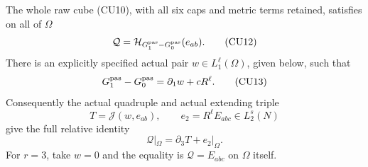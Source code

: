 \begin{theorem}
The whole raw cube (CU10), with all six caps and metric terms retained,
satisfies on all of $\Omega$
\[
       \mathcal Q=\mathcal H_{G_1^{\rm pas}-G_0^{\rm pas}}(e_{ab}).
 \tag{CU12}
\]
There is an explicitly specified actual pair
$w\in L_1^\ell(\Omega)$, given below, such that
\[
       G_1^{\rm pas}-G_0^{\rm pas}
                         =\partial_1w+cR^\ell.
 \tag{CU13}
\]
Consequently the actual quadruple and actual extending triple
\[
       T=\mathcal J(w,e_{ab}),\qquad e_2=R^\ell E_{abc}\in L_2^s(N)
 \tag{CU14}
\]
give the full relative identity
\[
                   \mathcal Q|_\Omega=\partial_3T+e_2|_\Omega.
 \tag{CU15}
\]
For $r=3$, take $w=0$ and the equality is
$\mathcal Q=E_{abc}$ on $\Omega$ itself.
\end{theorem}


